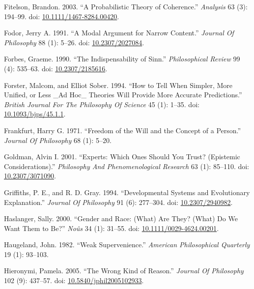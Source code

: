 \documentclass[
  10pt,
  letterpaper,
  DIV=11,
  numbers=noendperiod,
  twoside]{scrartcl}
\newlength{\cslhangindent}
\newenvironment{CSLReferences}[2] %
 {\begin{list}{}{%
  \setlength{\itemindent}{0pt}
  \setlength{\leftmargin}{0pt}
  \setlength{\parsep}{0pt}
  \ifodd #1
   \setlength{\leftmargin}{\cslhangindent}
   \setlength{\itemindent}{-1\cslhangindent}
  \fi
  \setlength{\itemsep}{#2\baselineskip}}}
 {\end{list}}
\begin{document}
\begin{CSLReferences}{1}{0}
Fitelson, Brandon. 2003. {``A Probabilistic Theory of Coherence.''}
\emph{Analysis} 63 (3): 194--99. doi:
\href{https://doi.org/10.1111/1467-8284.00420}{10.1111/1467-8284.00420}.

Fodor, Jerry A. 1991. {``A Modal Argument for Narrow Content.''}
\emph{Journal Of Philosophy} 88 (1): 5--26. doi:
\href{https://doi.org/10.2307/2027084}{10.2307/2027084}.

Forbes, Graeme. 1990. {``The Indispensability of Sinn.''}
\emph{Philosophical Review} 99 (4): 535--63. doi:
\href{https://doi.org/10.2307/2185616}{10.2307/2185616}.

Forster, Malcom, and Elliot Sober. 1994. {``How to Tell When Simpler,
More Unified, or Less \_Ad Hoc\_ Theories Will Provide More Accurate
Predictions.''} \emph{British Journal For The Philosophy Of Science} 45
(1): 1--35. doi:
\href{https://doi.org/10.1093/bjps/45.1.1}{10.1093/bjps/45.1.1}.

Frankfurt, Harry G. 1971. {``Freedom of the Will and the Concept of a
Person.''} \emph{Journal Of Philosophy} 68 (1): 5--20.

Goldman, Alvin I. 2001. {``Experts: Which Ones Should You Trust?
(Epistemic Considerations).''} \emph{Philosophy And Phenomenological
Research} 63 (1): 85--110. doi:
\href{https://doi.org/10.2307/3071090}{10.2307/3071090}.

Griffiths, P. E., and R. D. Gray. 1994. {``Developmental Systems and
Evolutionary Explanation.''} \emph{Journal Of Philosophy} 91 (6):
277--304. doi: \href{https://doi.org/10.2307/2940982}{10.2307/2940982}.

Haslanger, Sally. 2000. {``Gender and Race: (What) Are They? (What) Do
We Want Them to Be?''} \emph{Noûs} 34 (1): 31--55. doi:
\href{https://doi.org/10.1111/0029-4624.00201}{10.1111/0029-4624.00201}.

Haugeland, John. 1982. {``Weak Supervenience.''} \emph{American
Philosophical Quarterly} 19 (1): 93--103.

Hieronymi, Pamela. 2005. {``The Wrong Kind of Reason.''} \emph{Journal
Of Philosophy} 102 (9): 437--57. doi:
\href{https://doi.org/10.5840/jphil2005102933}{10.5840/jphil2005102933}.


\end{CSLReferences}
\end{document}
